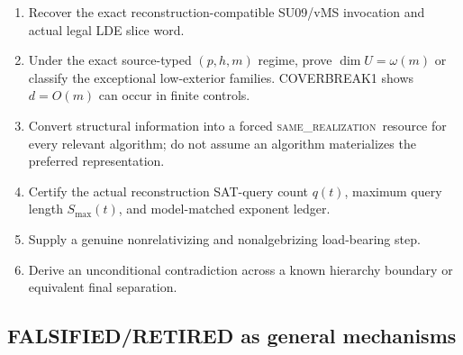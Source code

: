 \documentclass[11pt]{article}
\newcommand{\same}{\textnormal{\textsc{same\_realization}}}
\begin{document}
\begin{enumerate}
\item Recover the exact reconstruction-compatible SU09/vMS invocation and actual legal LDE slice word.
\item Under the exact source-typed \((p,h,m)\) regime, prove \(\dim U=\omega(m)\) or classify
the exceptional low-exterior families. COVERBREAK1 shows \(d=O(m)\) can occur in finite controls.
\item Convert structural information into a forced \same\ resource for every relevant
algorithm; do not assume an algorithm materializes the preferred representation.
\item Certify the actual reconstruction SAT-query count \(q(t)\), maximum query length
\(S_{\max}(t)\), and model-matched exponent ledger.
\item Supply a genuine nonrelativizing and nonalgebrizing load-bearing step.
\item Derive an unconditional contradiction across a known hierarchy boundary or equivalent final
separation.
\end{enumerate}

\subsection{FALSIFIED/RETIRED as general mechanisms}
\end{document}
